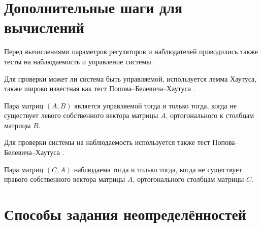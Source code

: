 \chapter{Дополнительные шаги для вычислений}\label{app:B}

Перед вычислениями параметров регуляторов и наблюдателей проводились также тесты на наблюдаемость и управление системы. 

Для проверки может ли система быть управляемой, используется лемма Хаутуса, также широко известная как тест Попова--Белевича--Хаутуса \cite{bernstein2018scalar}.
\begin{lemma}
	Пара матриц $(A, B)$ является управляемой тогда и только тогда, когда не существует левого собственного вектора матрицы $A$, ортогонального к столбцам матрицы $B$.
\end{lemma}

Для проверки системы на наблюдаемость используется также тест Попова--Белевича--Хаутуса \cite{Sontag1998}.

\begin{lemma}
	Пара матриц $(C, A)$ наблюдаема тогда и только тогда, когда не существует правого собственного вектора матрицы $A$, ортогонального столбцам матрицы $C$.
\end{lemma}

\chapter{Способы задания неопределённостей}\label{app:С}